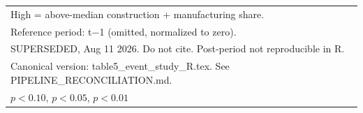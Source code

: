 \begin{table}[htbp]
\begin{tabular}{l*{1}{c}}
\multicolumn{2}{l}{\footnotesize High = above-median construction + manufacturing share.}\\
\multicolumn{2}{l}{\footnotesize Reference period: t$-$1 (omitted, normalized to zero).}\\
\multicolumn{2}{l}{\footnotesize SUPERSEDED, Aug 11 2026. Do not cite. Post-period not reproducible in R.}\\
\multicolumn{2}{l}{\footnotesize Canonical version: table5\_event\_study\_R.tex. See PIPELINE\_RECONCILIATION.md.}\\
\multicolumn{2}{l}{\footnotesize \sym{*} \(p<0.10\), \sym{**} \(p<0.05\), \sym{***} \(p<0.01\)}\\
\end{tabular}
\end{table}
